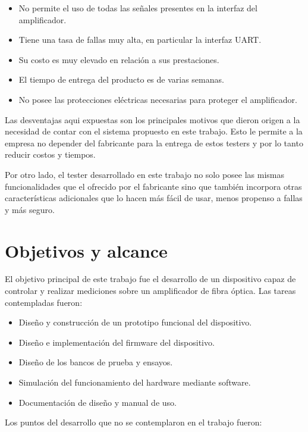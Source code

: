 \begin{itemize}
\item No permite el uso de todas las señales presentes en la interfaz del amplificador.
\item Tiene una tasa de fallas muy alta, en particular la interfaz UART.
\item Su costo es muy elevado en relación a sus prestaciones.
\item El tiempo de entrega del producto es de varias semanas.
\item No posee las protecciones eléctricas necesarias para proteger el amplificador.
\end{itemize}

Las desventajas aqui expuestas son los principales motivos que dieron origen a la necesidad de contar con el sistema propuesto en este trabajo. Esto le permite a la empresa no depender del fabricante para la entrega de estos testers y por lo tanto reducir costos y tiempos.

Por otro lado, el tester desarrollado en este trabajo no solo posee las mismas funcionalidades que el ofrecido por el fabricante sino que también incorpora otras características adicionales que lo hacen más fácil de usar, menos propenso a fallas y más seguro.


\section{Objetivos y alcance}

El objetivo principal de este trabajo fue el desarrollo de un dispositivo capaz de controlar y realizar mediciones sobre un amplificador de fibra óptica. Las tareas contempladas fueron:

\begin{itemize}
\item Diseño y construcción de un prototipo funcional del dispositivo.
\item Diseño e implementación del firmware del dispositivo.
\item Diseño de los bancos de prueba y ensayos.
\item Simulación del funcionamiento del hardware mediante software.
\item Documentación de diseño y manual de uso.
\end{itemize}

Los puntos del desarrollo que no se contemplaron en el trabajo fueron:


